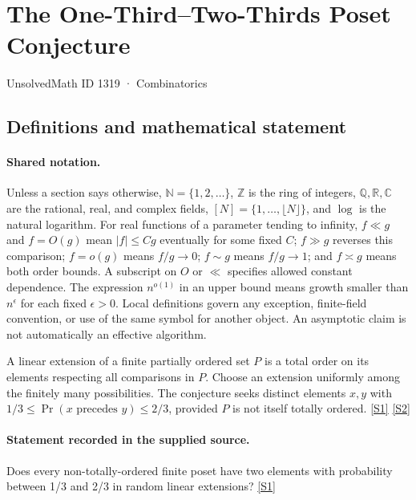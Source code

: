 \documentclass[11pt,a4paper]{article}
\newcommand{\N}{\mathbb{N}}
\newcommand{\Z}{\mathbb{Z}}
\newcommand{\Q}{\mathbb{Q}}
\newcommand{\R}{\mathbb{R}}
\newcommand{\C}{\mathbb{C}}
\newcommand{\sref}[2]{\hyperlink{source:#1:#2}{[S#2]}}
\begin{document}

\setcounter{section}{1318}

\section{The One-Third--Two-Thirds Poset Conjecture}\label{1319}

{\small\sffamily UnsolvedMath ID 1319 · Combinatorics}

\subsection{Definitions and mathematical statement}

\paragraph{Shared notation.}Unless a section says otherwise, $\N=\{1,2,\ldots\}$,
$\Z$ is the ring of integers, $\Q,\R,\C$ are the rational, real, and complex
fields, $[N]=\{1,\ldots,\lfloor N\rfloor\}$, and $\log$ is the natural
logarithm. For real functions of a parameter tending to infinity,
$f\ll g$ and $f=O(g)$ mean $|f|\leq Cg$ eventually for some fixed $C$;
$f\gg g$ reverses this comparison; $f=o(g)$ means $f/g\to0$;
$f\sim g$ means $f/g\to1$; and $f\asymp g$ means both order bounds.
A subscript on $O$ or $\ll$ specifies allowed constant dependence.
The expression $n^{o(1)}$ in an upper bound means growth smaller than
$n^\epsilon$ for each fixed $\epsilon>0$. Local definitions govern any
exception, finite-field convention, or use of the same symbol for another
object. An asymptotic claim is not automatically an effective algorithm.



A linear extension of a finite partially ordered set $P$ is a total order on its elements respecting all comparisons in $P$. Choose an extension uniformly among the finitely many possibilities. The conjecture seeks distinct elements $x,y$ with $1/3\leq\Pr(x\text{ precedes }y)\leq2/3$, provided $P$ is not itself totally ordered. \sref{1319}{1} \sref{1319}{2}

\paragraph{Statement recorded in the supplied source.}
Does every non-totally-ordered finite poset have two elements with probability between 1/3 and 2/3 in random linear extensions? \sref{1319}{1}
\end{document}
